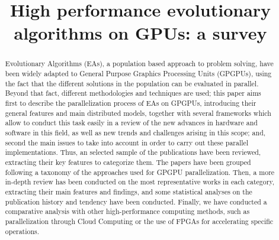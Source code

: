 \documentclass{article}
\begin{document}


\title{High performance evolutionary algorithms on GPUs: a survey}


\maketitle


\begin{abstract}
Evolutionary Algorithms (EAs), a population based approach to problem solving, have been widely adapted to General
Purpose Graphics Processing Units (GPGPUs), using the fact
that the different solutions in the population can be evaluated in
parallel. Beyond that fact, different methodologies and
techniques are used; this paper aims first to describe the
parallelization process of EAs on GPGPUs, introducing their general
features and main distributed models, together with several frameworks
which allow to conduct this task easily in a review of the new advances in hardware and software in this field, as well as new trends and challenges arising in this scope; and, second the main issues
to take into account in order to carry out these parallel
implementations.
Thus, an selected sample of the publications have been
reviewed, extracting their key features to categorize them. 
The papers have been grouped following a taxonomy of the approaches used for GPGPU parallelization. 
Then, a more in-depth review has been conducted on the most
representative works in each category, extracting their main features
and findings, and some statistical analyses on the publication history
and tendency have been conducted. 
Finally, we have conducted a comparative analysis with other
high-performance computing methods, such as parallelization through
Cloud Computing or the use of FPGAs for accelerating specific
operations. %
\end{abstract}
\end{document}
